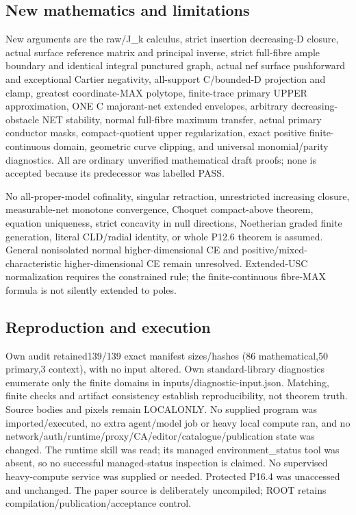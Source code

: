 \documentclass[11pt]{article}
\begin{document}
\subsection*{New mathematics and limitations}

New arguments are the raw/J\_k calculus, strict insertion decreasing-D closure, actual surface reference matrix and principal inverse, strict full-fibre ample boundary and identical integral punctured graph, actual nef surface pushforward and exceptional Cartier negativity, all-support C/bounded-D projection and clamp, greatest coordinate-MAX polytope, finite-trace primary UPPER approximation, ONE C majorant-net extended envelopes, arbitrary decreasing-obstacle NET stability, normal full-fibre maximum transfer, actual primary conductor masks, compact-quotient upper regularization, exact positive finite-continuous domain, geometric curve clipping, and universal monomial/parity diagnostics. All are ordinary unverified mathematical draft proofs; none is accepted because its predecessor was labelled PASS.

No all-proper-model cofinality, singular retraction, unrestricted increasing closure, measurable-net monotone convergence, Choquet compact-above theorem, equation uniqueness, strict concavity in null directions, Noetherian graded finite generation, literal CLD/radial identity, or whole P12.6 theorem is assumed. General nonisolated normal higher-dimensional CE and positive/mixed-characteristic higher-dimensional CE remain unresolved. Extended-USC normalization requires the constrained rule; the finite-continuous fibre-MAX formula is not silently extended to poles.

\subsection*{Reproduction and execution}

Own audit retained139/139 exact manifest sizes/hashes (86 mathematical,50 primary,3 context), with no input altered. Own standard-library diagnostics enumerate only the finite domains in inputs/diagnostic-input.json. Matching, finite checks and artifact consistency establish reproducibility, not theorem truth. Source bodies and pixels remain LOCALONLY. No supplied program was imported/executed, no extra agent/model job or heavy local compute ran, and no network/auth/runtime/proxy/CA/editor/catalogue/publication state was changed. The runtime skill was read; its managed environment\_status tool was absent, so no successful managed-status inspection is claimed. No supervised heavy-compute service was supplied or needed. Protected P16.4 was unaccessed and unchanged. The paper source is deliberately uncompiled; ROOT retains compilation/publication/acceptance control.
\end{document}
